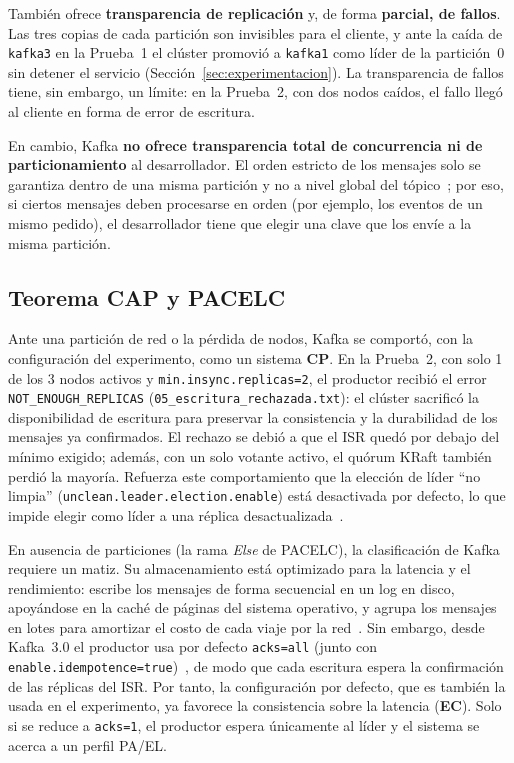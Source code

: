 \documentclass[12pt,a4paper]{article}
\begin{document}
También ofrece \textbf{transparencia de replicación} y, de forma \textbf{parcial, de fallos}. Las tres copias de cada partición son invisibles para el cliente, y ante la caída de \texttt{kafka3} en la Prueba~1 el clúster promovió a \texttt{kafka1} como líder de la partición~0 sin detener el servicio (Sección~\ref{sec:experimentacion}). La transparencia de fallos tiene, sin embargo, un límite: en la Prueba~2, con dos nodos caídos, el fallo llegó al cliente en forma de error de escritura.

En cambio, Kafka \textbf{no ofrece transparencia total de concurrencia ni de particionamiento} al desarrollador. El orden estricto de los mensajes solo se garantiza dentro de una misma partición y no a nivel global del tópico~\cite{KafkaDesign39}; por eso, si ciertos mensajes deben procesarse en orden (por ejemplo, los eventos de un mismo pedido), el desarrollador tiene que elegir una clave que los envíe a la misma partición.

\subsection{Teorema CAP y PACELC}
Ante una partición de red o la pérdida de nodos, Kafka se comportó, con la configuración del experimento, como un sistema \textbf{CP}. En la Prueba~2, con solo 1 de los 3 nodos activos y \texttt{min.insync.replicas=2}, el productor recibió el error \texttt{NOT\_ENOUGH\_REPLICAS} (\texttt{05\_escritura\_rechazada.txt}): el clúster sacrificó la disponibilidad de escritura para preservar la consistencia y la durabilidad de los mensajes ya confirmados. El rechazo se debió a que el ISR quedó por debajo del mínimo exigido; además, con un solo votante activo, el quórum KRaft también perdió la mayoría. Refuerza este comportamiento que la elección de líder ``no limpia'' (\texttt{unclean.leader.election.enable}) está desactivada por defecto, lo que impide elegir como líder a una réplica desactualizada~\cite{KafkaDesign39}.

En ausencia de particiones (la rama \textit{Else} de PACELC), la clasificación de Kafka requiere un matiz. Su almacenamiento está optimizado para la latencia y el rendimiento: escribe los mensajes de forma secuencial en un log en disco, apoyándose en la caché de páginas del sistema operativo, y agrupa los mensajes en lotes para amortizar el costo de cada viaje por la red~\cite{KafkaDesign39}. Sin embargo, desde Kafka~3.0 el productor usa por defecto \texttt{acks=all} (junto con \texttt{enable.idempotence=true})~\cite{KAFKA10619}, de modo que cada escritura espera la confirmación de las réplicas del ISR. Por tanto, la configuración por defecto, que es también la usada en el experimento, ya favorece la consistencia sobre la latencia (\textbf{EC}). Solo si se reduce a \texttt{acks=1}, el productor espera únicamente al líder y el sistema se acerca a un perfil PA/EL.
\end{document}
